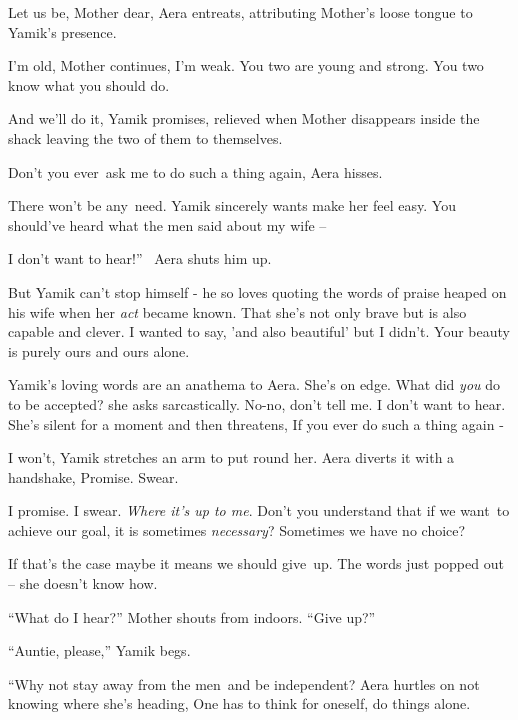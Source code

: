 \documentclass[12pt]{book}
\begin{document}
{\textquotedbl}Let us be, Mother dear,{\textquotedbl} Aera entreats, attributing Mother's loose tongue to Yamik's
presence.

{\textquotedbl}I'm old,{\textquotedbl} Mother continues, {\textquotedbl}I'm weak. You two are young and strong. You two
know what you should do.{\textquotedbl}

{\textquotedbl}And we'll do it,{\textquotedbl} Yamik promises, relieved when Mother disappears inside the shack leaving
the two of them to themselves.

{\textquotedbl}Don't you ever~ask me to do such a thing again,{\textquotedbl} Aera hisses.

{\textquotedbl}There won't be any~need.{\textquotedbl} Yamik sincerely wants make her feel easy. {\textquotedbl}You
should've heard what the men said about my wife --{\textquotedbl}

{\textquotedbl}I don't want to hear!'' \ Aera shuts him up.

But Yamik can't stop himself - he so loves quoting the words of praise heaped on his wife when her \textit{act} became
known. {\textquotedbl}That she's not only brave but is also capable and clever. I wanted to say, 'and also beautiful'
but I didn't. Your beauty is purely ours and ours alone.{\textquotedbl} ~

Yamik's loving words are an anathema to Aera. She's on edge. {\textquotedbl}What did \textit{you} do to be
accepted?{\textquotedbl} she asks sarcastically. {\textquotedbl}No-no, don't tell me. I don't want to
hear.{\textquotedbl} She's silent for a moment and then threatens, {\textquotedbl}If you ever do such a thing again
-{\textquotedbl}

{\textquotedbl}I won't,{\textquotedbl} Yamik stretches an arm to put round her. Aera diverts it with a handshake,
{\textquotedbl}Promise. Swear.{\textquotedbl}

{\textquotedbl}I promise. I swear. \textit{Where it's up to me}. Don't you understand that if we want~to achieve our
goal, it is sometimes \textit{necessary}? Sometimes we have no choice?{\textquotedbl}

{\textquotedbl}If that's the case maybe it means we should give~up.{\textquotedbl} The words just popped out -- she
doesn't know how.

{}``What do I hear?'' Mother shouts from indoors. ``Give up?''

{}``Auntie, please,'' Yamik begs.

{}``Why not stay away from the men~and be independent?{\textquotedbl} Aera hurtles on not knowing where she's heading,
{\textquotedbl}One has to think for oneself, do things alone.{\textquotedbl}
\end{document}
